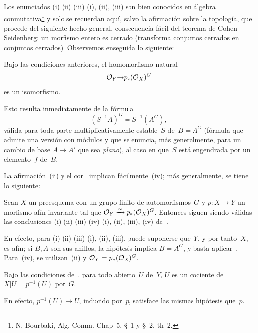 Los enunciados
{(i) (ii) (iii)}
{(i), (ii), (iii)}
son bien conocidos en álgebra conmutativa\footnote{\Cf N. Bourbaki,
Alg. Comm. Chap\ptbl~5, \S~1 y \S~2, th\ptbl~2.} y solo se recuerdan aquí,
salvo la afirmación sobre la topología, que procede del siguiente hecho
general, consecuencia fácil del teorema de Cohen--Seidenberg: un morfismo
entero es cerrado (\ie transforma conjuntos cerrados en conjuntos cerrados).
Observemos enseguida lo siguiente:

\begin{corollaire}
\label{V.1.2}
Bajo las condiciones anteriores, el homomorfismo natural
$$\cal{O}_Y{\to} p_*(\cal{O}_X)^G$$
es un isomorfismo.
\end{corollaire}

Esto resulta inmediatamente de la fórmula
$$
(S^{-1}A)^G = S^{-1}(A^G),
$$
válida para toda parte multiplicativamente estable~$S$ de~$B=A^G$
(fórmula que admite una versión con módulos y que se enuncia, más
generalmente, para un cambio de base $A\to A'$ que sea \emph{plano}),
al caso en que~$S$ está engendrada por un elemento~$f$ de~$B$.

La afirmación~(ii) y el cor\ptbl~ implican fácilmente~(iv); más
generalmente, se tiene lo siguiente:

\begin{proposition}
\label{V.1.3}
Sean
$X$ un preesquema con un grupo finito de automorfismos~$G$ y
$p\colon{}X\to{}Y$ un morfismo afín invariante tal que
$\cal{O}_Y\isomto p_*(\cal{O}_X)^G$. Entonces siguen siendo válidas las
conclusiones
{\textup{(i) (ii) (iii) (iv)}}
{\textup{(i), (ii), (iii), (iv)}}
de~.
\end{proposition}

En efecto, para
{(i) (ii) (iii)}
{(i), (ii), (iii),}
puede suponerse que~$Y$, y por tanto~$X$, es afín; si $B,A$ son sus anillos,
la hipótesis implica $B=A^G$, y basta aplicar~. Para~(iv), se
utilizan~(ii) y $\cal{O}_Y=p_*(\cal{O}_X)^G$.

\begin{corollaire}
\label{V.1.4}
Bajo las condiciones de~, para todo abierto~$U$ de~$Y$, $U$ es
un cociente de $X|U=p^{-1}(U)$ por~$G$.
\end{corollaire}

En efecto, $p^{-1}(U)\to{}U$, inducido por~$p$, satisface las mismas
hipótesis que~$p$.

